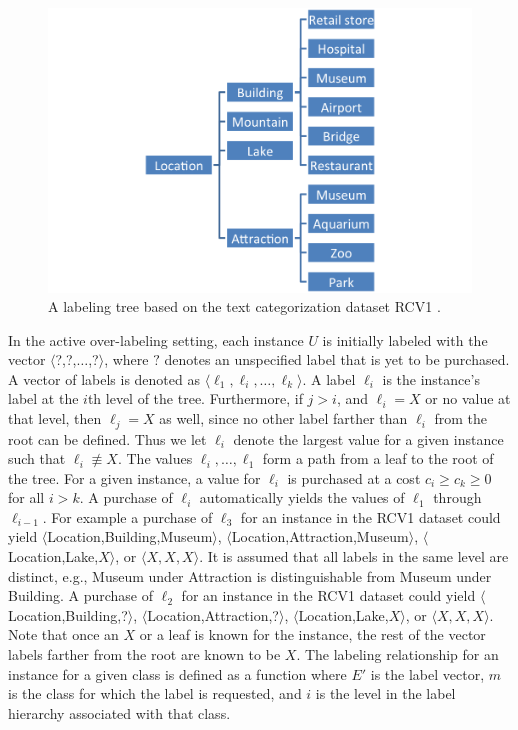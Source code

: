 \documentclass[ms]{nuthesis}
\begin{document}
\FloatBarrier
\begin{figure}[!htb]
	\centering
    \includegraphics[width=0.85\columnwidth]{fig/exp-ontology}
    \caption{A labeling tree based on the text categorization dataset RCV1 \cite{Lewis2004}.}
    \label{fig:exp-ontology}
\end{figure}
\FloatBarrier

In the active over-labeling setting, each instance $U$ is initially labeled with the vector
$\langle$?,?,$\ldots$,?$\rangle$, where $?$ denotes an unspecified label that is yet to be
purchased. A vector of labels is denoted as $\langle \ell_1,\ell_i,\ldots,\ell_k \rangle$.
A label $\ell_i$ is the instance's label at the $i$th
level of the tree. Furthermore, if $j > i$, and $\ell_i = X$ or no value at that level,
then $\ell_j=X$ as well, since no other label farther than $\ell_i$
from the root can be defined. Thus we let $\ell_i$ denote the largest value for a given
 instance such that $\ell_i \not\equiv X$. The values $\ell_i,\ldots,\ell_1$ form a path
  from a leaf to the root of the tree. For a given instance, a value for $\ell_i$ is purchased
  at a cost $c_i \geq c_k \geq 0$ for all $i>k$. A purchase of $\ell_i$ automatically
  yields the values of $\ell_1$ through $\ell_{i-1}$. For example a purchase of $\ell_3$ for
  an instance in the RCV1 dataset could yield $\langle$Location,Building,Museum$\rangle$,
  $\langle$Location,Attraction,Museum$\rangle$,
$\langle$Location,Lake,$X\rangle$, or $\langle X,X,X \rangle$. It is assumed
that all labels in the same level are distinct, e.g., Museum under Attraction
is distinguishable from Museum under Building. A purchase of $\ell_2$ for an instance
in the RCV1 dataset could yield $\langle$Location,Building,?$\rangle$,  $\langle$Location,Attraction,?$\rangle$,
$\langle$Location,Lake,$X\rangle$, or $\langle X,X,X \rangle$. Note that once an $X$ or
a leaf is known for the instance, the rest of the vector labels farther from the root are
known to be $X$. The labeling relationship for an instance for a given
class is defined as a function
 where $E'$ is the label vector,
$m$ is the class for which the label is requested, and $i$ is the
level in the label hierarchy associated with that class.
\end{document}
